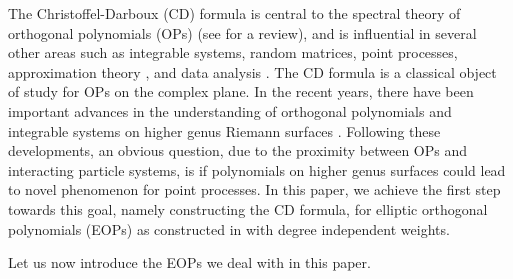 \documentclass[11pt,a4paper]{article}
\theoremstyle{definition}
\numberwithin{equation}{section}
\numberwithin{theorem}{section}
\begin{document}
The Christoffel-Darboux (CD) formula is central to the spectral theory of
orthogonal polynomials (OPs) (see \cite{simon2008christoffel} for a review), and is influential in several other areas such as integrable systems, random matrices, point processes, approximation theory \cite{nevai1986geza}, and data analysis \cite{lasserre2022christoffel}. The CD formula is a classical object of study for OPs on the complex plane. In the recent years, there have been important advances in the understanding of orthogonal polynomials and integrable systems on higher genus Riemann surfaces \cite{fasondini2023orthogonal,bertola2022nonlinear,DLR24,del2020isomonodromic,desiraju2025nonlinear}. Following these developments, an obvious question, due to the proximity between OPs and interacting particle systems, is if polynomials on higher genus surfaces could lead to novel phenomenon for point processes. In this paper, we achieve the first step towards this goal, namely constructing the CD  formula, for elliptic orthogonal polynomials (EOPs)  as constructed in \cite{DLR24} with degree independent weights. 


Let us now introduce the EOPs we deal with in this paper. 

\end{document}

